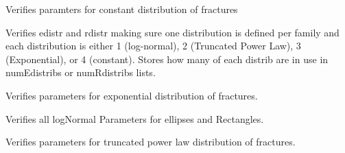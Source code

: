 \documentclass[letterpaper,10pt,english]{sphinxmanual}
\begin{document}
\begin{fulllineitems}

\begin{fulllineitems}
\label{\detokenize{pydfnworks:pydfnworks.distributions.distr.constant_dist}}
Verifies paramters for constant distribution of fractures

\end{fulllineitems}


\begin{fulllineitems}
\label{\detokenize{pydfnworks:pydfnworks.distributions.distr.distr}}
Verifies \sphinxquotedblleft{}edistr\sphinxquotedblright{} and \sphinxquotedblleft{}rdistr\sphinxquotedblright{} making sure one distribution is defined per family and
each distribution is either 1 (log-normal), 2 (Truncated Power Law), 3 (Exponential), or 4 (constant).
Stores how many of each distrib are in use in numEdistribs or numRdistribs lists.

\end{fulllineitems}


\begin{fulllineitems}
\label{\detokenize{pydfnworks:pydfnworks.distributions.distr.exponential_dist}}
Verifies parameters for exponential distribution of fractures.

\end{fulllineitems}


\begin{fulllineitems}
\label{\detokenize{pydfnworks:pydfnworks.distributions.distr.lognormal_dist}}
Verifies all logNormal Parameters for ellipses and Rectangles.

\end{fulllineitems}


\begin{fulllineitems}
\label{\detokenize{pydfnworks:pydfnworks.distributions.distr.tpl_dist}}
Verifies parameters for truncated power law distribution of fractures.

\end{fulllineitems}


\end{fulllineitems}
\end{document}

